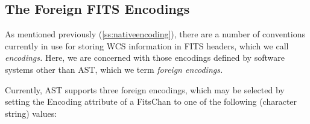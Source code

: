 \documentclass[twoside,11pt]{article}
\newcommand{\htmlref}[2]{#1}
\newcommand{\secref}[1]{\S\ref{#1}}
\renewcommand{\secref}[1]{\ref{#1}}
\begin{document}
\subsection{\label{ss:foreignencodings}The Foreign FITS Encodings}

As mentioned previously (\secref{ss:nativeencoding}), there are a
number of conventions currently in use for storing WCS information in
FITS headers, which we call {\em{encodings.}} Here, we are concerned
with those encodings defined by software systems other than AST, which
we term {\em{foreign encodings.}}

Currently, AST supports three foreign encodings, which may be selected
by setting the \htmlref{Encoding}{Encoding} attribute of a \htmlref{FitsChan}{FitsChan} to one of the
following (character string) values:
\end{document}
